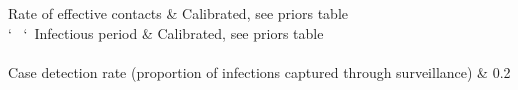 
Rate of effective contacts & Calibrated, see priors table \\` \ `\
Infectious period & Calibrated, see priors table \\\\
Case detection rate (proportion of infections captured through surveillance) & 0.2  \\\\